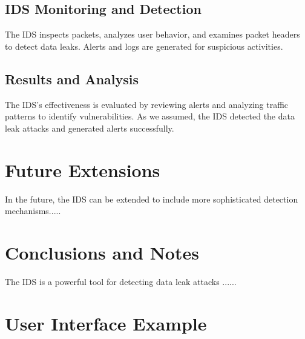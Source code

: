 \documentclass{article}
\begin{document}
\subsection{IDS Monitoring and Detection}
The IDS inspects packets, analyzes user behavior, and examines packet headers to detect data leaks. Alerts and logs are generated for suspicious activities.

\subsection{Results and Analysis}
The IDS's effectiveness is evaluated by reviewing alerts and analyzing traffic patterns to identify vulnerabilities.
As we assumed, the IDS detected the data leak attacks and generated alerts successfully.

\section{Future Extensions}
In the future, the IDS can be extended to include more sophisticated detection mechanisms.....

\section{Conclusions and Notes}
The IDS is a powerful tool for detecting data leak attacks ...... 

\appendix
\section{User Interface Example}
\label{sec:ui}
\end{document}
